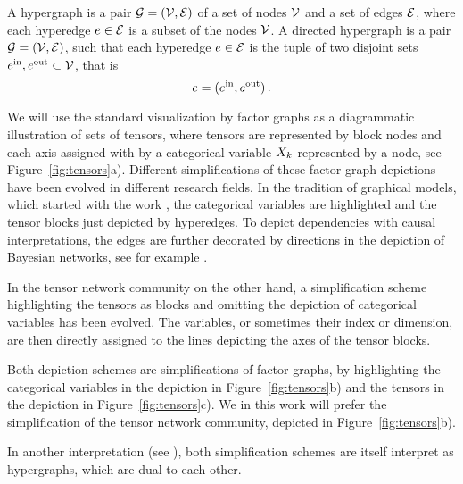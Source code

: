 \begin{definition}\label{def:hypergraphs}
	A hypergraph is a pair $\mathcal{G}=(\mathcal{V},\mathcal{E})$ of a set of nodes $\mathcal{V}$ and a set of edges $\mathcal{E}$, where each hyperedge $e\in\mathcal{E}$ is a subset of the nodes $\mathcal{V}$.
	A directed hypergraph is a pair $\mathcal{G}=(\mathcal{V},\mathcal{E})$, such that each hyperedge $e\in\mathcal{E}$ is the tuple of two disjoint sets $e^{\mathrm{in}},e^{\mathrm{out}}\subset\mathcal{V}$, that is
		\[ e = (e^{\mathrm{in}},e^{\mathrm{out}})  \, . \]
\end{definition}

We will use the standard visualization by factor graphs as a diagrammatic illustration of sets of tensors, where tensors are represented by block nodes and each axis assigned with by a categorical variable $X_{k}$ represented by a node, see Figure~\ref{fig:tensors}a).
Different simplifications of these factor graph depictions have been evolved in different research fields.
In the tradition of graphical models, which started with the work \cite{pearl_probabilistic_1988}, the categorical variables are highlighted and the tensor blocks just depicted by hyperedges.
To depict dependencies with causal interpretations, the edges are further decorated by directions in the depiction of Bayesian networks, see for example \cite{pearl_causality_2009}.

In the tensor network community on the other hand, a simplification scheme highlighting the tensors as blocks and omitting the depiction of categorical variables has been evolved.
The variables, or sometimes their index or dimension, are then directly assigned to the lines depicting the axes of the tensor blocks.

Both depiction schemes are simplifications of factor graphs, by highlighting the categorical variables in the depiction in Figure~\ref{fig:tensors}b) and the tensors in the depiction in Figure~\ref{fig:tensors}c).
We in this work will prefer the simplification of the tensor network community, depicted in Figure~\ref{fig:tensors}b).

In another interpretation (see \cite{robeva_duality_2019}), both simplification schemes are itself interpret as hypergraphs, which are dual to each other.


